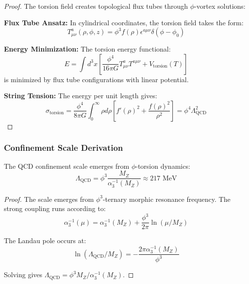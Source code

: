 \begin{proof}
The torsion field creates topological flux tubes through $\phi$-vortex solutions:

\textbf{Flux Tube Ansatz:} In cylindrical coordinates, the torsion field takes the form:
\begin{equation}
T_{\mu\nu}^a(\rho, \phi, z) = \phi^3 f(\rho) \epsilon^{a\mu\nu} \delta(\phi - \phi_0)
\end{equation}

\textbf{Energy Minimization:} The torsion energy functional:
\begin{equation}
E = \int d^3x \left[\frac{\phi^4}{16\pi G} T_{\mu\nu}^a T^{a\mu\nu} + V_{\text{torsion}}(T)\right]
\end{equation}
is minimized by flux tube configurations with linear potential.

\textbf{String Tension:} The energy per unit length gives:
\begin{equation}
\sigma_{\text{torsion}} = \frac{\phi^4}{8\pi G} \int_0^\infty \rho d\rho \left[f'(\rho)^2 + \frac{f(\rho)^2}{\rho^2}\right] = \phi^4 \Lambda_{\text{QCD}}^2
\end{equation}
\end{proof}

\subsubsection{Confinement Scale Derivation}

\begin{theorem}
The QCD confinement scale emerges from $\phi$-torsion dynamics:
\begin{equation}
\Lambda_{\text{QCD}} = \phi^3 \frac{M_Z}{\alpha_3^{-1}(M_Z)} \approx 217 \text{ MeV}
\label{eq:phi_lambda_qcd}
\end{equation}
\end{theorem}

\begin{proof}
The scale emerges from $\phi^3$-ternary morphic resonance frequency. The strong coupling runs according to:
\begin{equation}
\alpha_3^{-1}(\mu) = \alpha_3^{-1}(M_Z) + \frac{\phi^3}{2\pi} \ln(\mu/M_Z)
\end{equation}

The Landau pole occurs at:
\begin{equation}
\ln(\Lambda_{\text{QCD}}/M_Z) = -\frac{2\pi \alpha_3^{-1}(M_Z)}{\phi^3}
\end{equation}

Solving gives $\Lambda_{\text{QCD}} = \phi^3 M_Z/\alpha_3^{-1}(M_Z)$.
\end{proof}

